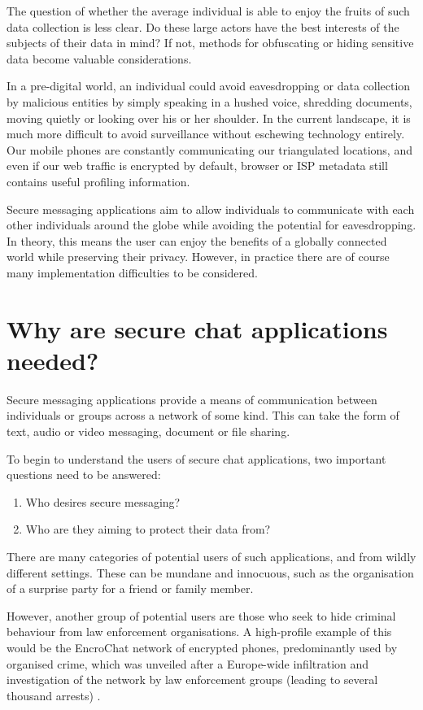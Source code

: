 \documentclass{mproj}
\begin{document}
The question of whether the average individual is able to enjoy the fruits of such data collection is less clear. Do these large actors have the best interests of the subjects of their data in mind? If not, methods for obfuscating or hiding sensitive data become valuable considerations.

In a pre-digital world, an individual could avoid eavesdropping or data collection by malicious entities by simply speaking in a hushed voice, shredding documents, moving quietly or looking over his or her shoulder. In the current landscape, it is much more difficult to avoid surveillance without eschewing technology entirely. Our mobile phones are constantly communicating our triangulated locations, and even if our web traffic is encrypted by default, browser or ISP metadata still contains useful profiling information.

Secure messaging applications aim to allow individuals to communicate with each other individuals around the globe while avoiding the potential for eavesdropping. In theory, this means the user can enjoy the benefits of a globally connected world while preserving their privacy. However, in practice there are of course many implementation difficulties to be considered.

\section{Why are secure chat applications needed?}
Secure messaging applications provide a means of communication between individuals or groups across a network of some kind. This can take the form of text, audio or video messaging, document or file sharing.

To begin to understand the users of secure chat applications, two important questions need to be answered:
\begin{enumerate}
	\item Who desires secure messaging?
	\item Who are they aiming to protect their data from?
\end{enumerate}

There are many categories of potential users of such applications, and from wildly different settings. These can be mundane and innocuous, such as the organisation of a surprise party for a friend or family member. 

However, another group of potential users are those who seek to hide criminal behaviour from law enforcement organisations. A high-profile example of this would be the EncroChat network of encrypted phones, predominantly used by organised crime, which was unveiled after a Europe-wide infiltration and investigation of the network by law enforcement groups (leading to several thousand arrests) \cite{sommer2022evidence}. 
\end{document}
